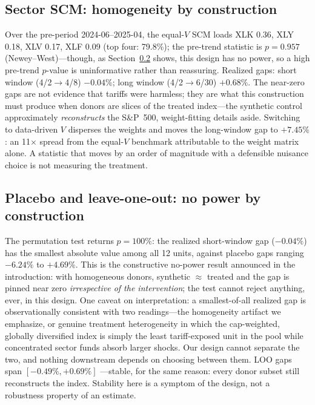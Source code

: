 \documentclass[11pt,a4paper]{article}
\begin{document}
\subsection{Sector SCM: homogeneity by construction}\label{sec:vsens}

Over the pre-period 2024-06--2025-04, the equal-$V$ SCM loads XLK 0.36,
XLY 0.18, XLV 0.17, XLF 0.09 (top four: 79.8\%); the pre-trend statistic
is $p=0.957$ (Newey--West)---though, as Section~\ref{sec:placebo} shows,
this design has no power, so a high pre-trend $p$-value is uninformative
rather than reassuring. Realized gaps: short window (4/2$\to$4/8)
$-0.04\%$; long window (4/2$\to$6/30) $+0.68\%$. The near-zero gaps are
not evidence that tariffs were harmless; they are what this construction
must produce when donors are slices of the treated index---the synthetic
control approximately \emph{reconstructs} the S\&P~500, weight-fitting
details aside. Switching to data-driven $V$
\citep{abadie2021} disperses the weights and moves the long-window gap to
$+7.45\%$: an 11$\times$ spread from the equal-$V$ benchmark attributable
to the weight matrix alone. A statistic that moves by an order of
magnitude with a defensible nuisance choice is not measuring the treatment.

\subsection{Placebo and leave-one-out: no power by construction}
\label{sec:placebo}

The permutation test returns $p=100\%$: the realized short-window gap
($-0.04\%$) has the smallest absolute value among all 12 units, against
placebo gaps ranging $-6.24\%$ to $+4.69\%$. This is the constructive
no-power result announced in the introduction: with homogeneous donors,
synthetic $\approx$ treated and the gap is pinned near zero
\emph{irrespective of the intervention}; the test cannot reject anything,
ever, in this design. One caveat on interpretation: a smallest-of-all
realized gap is observationally consistent with two readings---the
homogeneity artifact we emphasize, or genuine treatment heterogeneity in
which the cap-weighted, globally diversified index is simply the least
tariff-exposed unit in the pool while concentrated sector funds absorb
larger shocks. Our design cannot separate the two, and nothing downstream
depends on choosing between them. LOO gaps span $[-0.49\%, +0.69\%]$%
---stable, for the same reason: every donor subset still reconstructs the
index. Stability here is a symptom of the design, not a robustness
property of an estimate.
\end{document}
